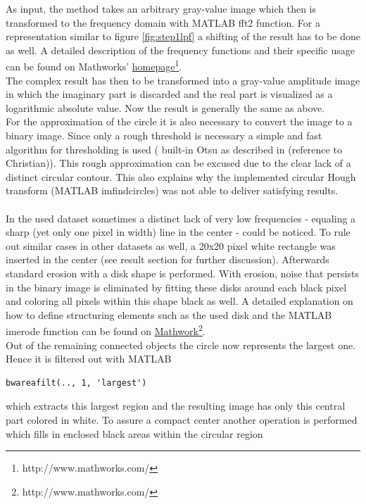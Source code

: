 \documentclass{article}
\begin{document}
As input, the method takes an arbitrary gray-value image which then is transformed to the frequency domain with MATLAB fft2 function. For a representation similar to figure \ref{fig:step1lpf} a shifting of the result has to be done as well. 
A detailed description of the frequency functions and their specific usage can be found on Mathworks'  \href{http://www.mathworks.com/}{homepage}\footnote{http://www.mathworks.com/}. \\
The complex result has then to be transformed into a gray-value amplitude image in which the imaginary part is discarded and the real part is visualized as a logarithmic absolute value. Now the result is generally the same as above. \\
For the approximation of the circle it is also necessary to convert the image to a binary image. Since only a rough threshold is necessary a simple and fast algorithm for thresholding is used (%
built-in Otsu as described in (reference to Christian)). This rough approximation can be excused due to the clear lack of a distinct circular contour. %
This also explains why the implemented circular Hough transform (MATLAB imfindcircles) was not able to deliver satisfying results.\\
\\
In the used dataset sometimes a distinct lack of very low frequencies - equaling a sharp (yet only one pixel in width) line in the center - could be noticed. To rule out similar cases in other datasets as well, a 20x20 pixel white rectangle was inserted in the center (see result section for further discussion).
Afterwards standard erosion with a disk shape is performed. With erosion, noise that persists in the binary image is eliminated by fitting these disks around each black pixel and coloring all pixels within this shape black as well. A detailed explanation on how to define structuring elements such as the used disk and the MATLAB imerode function can be found on \href{http://www.mathworks.com/}{Mathwork}\footnote{http://www.mathworks.com/}. \\
Out of the remaining connected objects the circle now represents the largest one. Hence it is filtered out with MATLAB \begin{verbatim}bwareafilt(.., 1, 'largest') \end{verbatim}
which extracts this largest region and the resulting image has only this central part colored in white. To assure a compact center another operation is performed which fills in enclosed black areas within the circular region 
\end{document}
